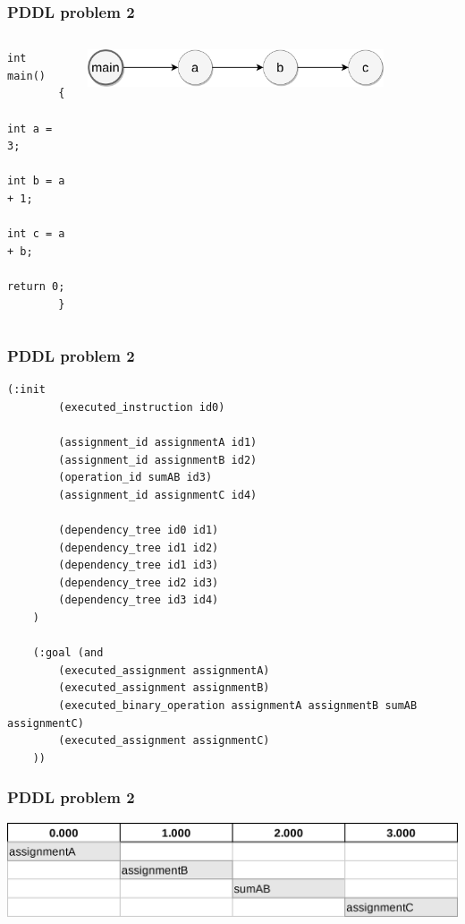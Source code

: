 \documentclass{beamer}
\begin{document}
\begin{frame}[fragile]
  \frametitle{PDDL problem 2}

  \begin{columns}
    \begin{column}{0.35\textwidth}
      \begin{lstlisting}[style=cppStyle]
        int main()
        {
          int a = 3;
          int b = a + 1;
          int c = a + b;
          return 0;
        }
      \end{lstlisting}
    \end{column}
    \begin{column}{0.65\textwidth}
      \begin{center}
        \includegraphics[width=0.8\textwidth]{../images/dependency-tree-NotParallel.png}
      \end{center}
    \end{column}
  \end{columns}
\end{frame}

\begin{frame}[fragile]
  \frametitle{PDDL problem 2}

  \begin{lstlisting}[style=pddlStyle,basicstyle=\ttfamily\fontsize{10pt}{10pt}\selectfont]
    (:init
        (executed_instruction id0)

        (assignment_id assignmentA id1)
        (assignment_id assignmentB id2)
        (operation_id sumAB id3)
        (assignment_id assignmentC id4)
        
        (dependency_tree id0 id1)
        (dependency_tree id1 id2)
        (dependency_tree id1 id3)
        (dependency_tree id2 id3)
        (dependency_tree id3 id4)
    )

    (:goal (and
        (executed_assignment assignmentA)
        (executed_assignment assignmentB)
        (executed_binary_operation assignmentA assignmentB sumAB assignmentC)
        (executed_assignment assignmentC)
    ))
  \end{lstlisting}
\end{frame}

\begin{frame}[fragile]
  \frametitle{PDDL problem 2}

  \includegraphics[width=1\textwidth]{../images/parallel-tasks-NotParallel.png}
\end{frame}
\end{document}
